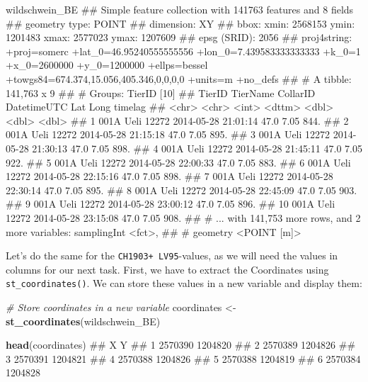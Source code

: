 \documentclass[]{book}
\newenvironment{Shaded}{\begin{snugshade}}{\end{snugshade}}
\newcommand{\KeywordTok}[1]{\textcolor[rgb]{0.13,0.29,0.53}{\textbf{{#1}}}}
\newcommand{\StringTok}[1]{\textcolor[rgb]{0.31,0.60,0.02}{{#1}}}
\newcommand{\CommentTok}[1]{\textcolor[rgb]{0.56,0.35,0.01}{\textit{{#1}}}}
\newcommand{\NormalTok}[1]{{#1}}
\theoremstyle{definition}
\theoremstyle{definition}
\theoremstyle{definition}
\theoremstyle{remark}
\begin{document}
\begin{Shaded}
\begin{Highlighting}[]

\NormalTok{wildschwein_BE}
\NormalTok{## Simple feature collection with 141763 features and 8 fields}
\NormalTok{## geometry type:  POINT}
\NormalTok{## dimension:      XY}
\NormalTok{## bbox:           xmin: 2568153 ymin: 1201483 xmax: 2577023 ymax: 1207609}
\NormalTok{## epsg (SRID):    2056}
\NormalTok{## proj4string:    +proj=somerc +lat_0=46.95240555555556 +lon_0=7.439583333333333 +k_0=1 +x_0=2600000 +y_0=1200000 +ellps=bessel +towgs84=674.374,15.056,405.346,0,0,0,0 +units=m +no_defs}
\NormalTok{## # A tibble: 141,763 x 9}
\NormalTok{## # Groups:   TierID [10]}
\NormalTok{##    TierID TierName CollarID DatetimeUTC           Lat  Long timelag}
\NormalTok{##    <chr>  <chr>       <int> <dttm>              <dbl> <dbl>   <dbl>}
\NormalTok{##  1 001A   Ueli        12272 2014-05-28 21:01:14  47.0  7.05    844.}
\NormalTok{##  2 001A   Ueli        12272 2014-05-28 21:15:18  47.0  7.05    895.}
\NormalTok{##  3 001A   Ueli        12272 2014-05-28 21:30:13  47.0  7.05    898.}
\NormalTok{##  4 001A   Ueli        12272 2014-05-28 21:45:11  47.0  7.05    922.}
\NormalTok{##  5 001A   Ueli        12272 2014-05-28 22:00:33  47.0  7.05    883.}
\NormalTok{##  6 001A   Ueli        12272 2014-05-28 22:15:16  47.0  7.05    898.}
\NormalTok{##  7 001A   Ueli        12272 2014-05-28 22:30:14  47.0  7.05    895.}
\NormalTok{##  8 001A   Ueli        12272 2014-05-28 22:45:09  47.0  7.05    903.}
\NormalTok{##  9 001A   Ueli        12272 2014-05-28 23:00:12  47.0  7.05    896.}
\NormalTok{## 10 001A   Ueli        12272 2014-05-28 23:15:08  47.0  7.05    908.}
\NormalTok{## # ... with 141,753 more rows, and 2 more variables: samplingInt <fct>,}
\NormalTok{## #   geometry <POINT [m]>}
\end{Highlighting}
\end{Shaded}

Let's do the same for the \texttt{CH1903+\ LV95}-values, as we will need
the values in columns for our next task. First, we have to extract the
Coordinates using \texttt{st\_coordinates()}. We can store these values
in a new variable and display them:

\begin{Shaded}
\begin{Highlighting}[]
\CommentTok{# Store coordinates in a new variable}
\NormalTok{coordinates <-}\StringTok{ }\KeywordTok{st_coordinates}\NormalTok{(wildschwein_BE)}

\KeywordTok{head}\NormalTok{(coordinates)}
\NormalTok{##         X       Y}
\NormalTok{## 1 2570390 1204820}
\NormalTok{## 2 2570389 1204826}
\NormalTok{## 3 2570391 1204821}
\NormalTok{## 4 2570388 1204826}
\NormalTok{## 5 2570388 1204819}
\NormalTok{## 6 2570384 1204828}
\end{Highlighting}
\end{Shaded}
\end{document}
